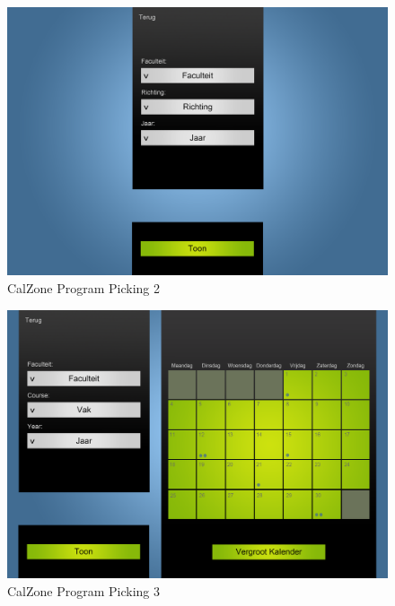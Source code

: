 \begin{center}
\begin{figure}[H]
\caption{CalZone Program Picking 2}
\centerline{\includegraphics[scale=0.4]{img/Calzoneprogrammepicking2}}
\label{fig:CalZone Program Picking 2}
\end{figure}

\begin{figure}[H]
\caption{CalZone Program Picking 3}
\centerline{\includegraphics[scale=0.4]{img/Calzoneprogrammepicking3}}
\label{fig:CalZone Program Picking 3}
\end{figure}


\end{center}
\clearpage
